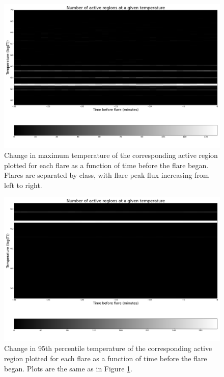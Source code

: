 \documentclass[referee,a4paper,12pt]{swsc}
\begin{document}
\begin{linenumbers}
\begin{figure}
	\centering
		\includegraphics[width=\columnwidth]{tempplotsmax/allars_hist.png}
	\caption{Change in maximum temperature of the corresponding active region plotted for each flare as a function of time before the flare began.
		Flares are separated by class, with flare peak flux increasing from left to right.}
	\label{fig:allars_max}
\end{figure}
\begin{figure}
	\centering
		\includegraphics[width=\columnwidth]{tempplots_p95/allars_hist.png}
	\caption{Change in 95th percentile temperature of the corresponding active region plotted for each flare as a function of time before the flare began.
		Plots are the same as in Figure \ref{fig:allars_max}.}
	\label{fig:allars_p95}
\end{figure}
\begin{figure}

\end{figure}
\end{linenumbers}
\end{document}
